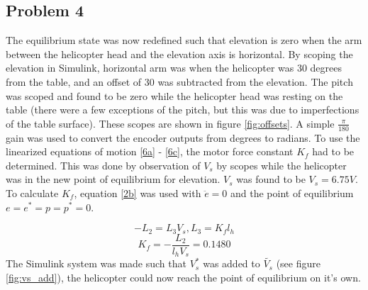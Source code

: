 \subsection{Problem 4}
The equilibrium state was now redefined such that elevation is zero when the arm between the helicopter head and the elevation axis is horizontal. By scoping the elevation in Simulink, horizontal arm was when the helicopter was 30 degrees from the table, and an offset of 30 was subtracted from the elevation. The pitch was scoped and found to be zero while the helicopter head was resting on the table (there were a few exceptions of the pitch, but this was due to imperfections of the table surface). These scopes are shown in figure \ref{fig:offsets}. A simple $\frac{\pi}{180}$ gain was used to convert the encoder outputs from degrees to radians.
\newline\newline
To use the linearized equations of motion \eqref{6a} - \eqref{6c}, the motor force constant $K_f$ had to be determined. This was done by observation of $V_s$ by scopes while the helicopter was in the new point of equilibrium for elevation. $V_s$ was found to be $V_s = 6.75V$. To calculate $K_f$, equation \eqref{2b} was used with $\ddot{e} = 0$ and the point of equilibrium $e = e^* = p = p^* = 0$.

\begin{equation*}
    -L_2 = L_3 V_s, L_3 = K_f l_h
\end{equation*}
\begin{equation}\label{eq:K_f}
    K_f = - \frac{L_2}{l_h V_s} = 0.1480
\end{equation}
The Simulink system was made such that $V_s^*$ was added to $\tilde{V_s}$ (see figure \ref{fig:vs_add}), the helicopter could now reach the point of equilibrium on it's own.

